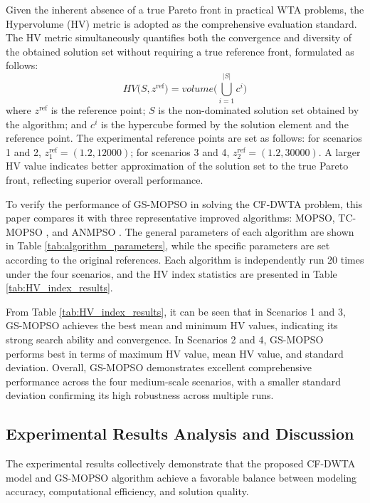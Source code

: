 \documentclass[lettersize,journal]{IEEEtran}
\begin{document}
Given the inherent absence of a true Pareto front in practical WTA problems, the Hypervolume (HV) metric \cite{guerreiro2021hypervolume} is adopted as the comprehensive evaluation standard. The HV metric simultaneously quantifies both the convergence and diversity of the obtained solution set without requiring a true reference front, formulated as follows:
\begin{equation}
HV\big(S,z^{\text{ref}}\big)=volume\bigg(\bigcup_{i=1}^{|S|}c^i\bigg)
\end{equation}
where $z^{\text{ref}}$ is the reference point; $S$ is the non-dominated solution set obtained by the algorithm; and $c^i$ is the hypercube formed by the solution element and the reference point. The experimental reference points are set as follows: for scenarios 1 and 2, $z^{\text{ref}}_1= (1.2, 12000)$; for scenarios 3 and 4, $z^{\text{ref}}_2= (1.2, 30000)$. A larger HV value indicates better approximation of the solution set to the true Pareto front, reflecting superior overall performance.

To verify the performance of GS-MOPSO in solving the CF-DWTA problem, this paper compares it with three representative improved algorithms: MOPSO, TC-MOPSO \cite{han2022improved}, and ANMPSO \cite{gu2021multi}. The general parameters of each algorithm are shown in Table \ref{tab:algorithm_parameters}, while the specific parameters are set according to the original references. Each algorithm is independently run 20 times under the four scenarios, and the HV index statistics are presented in Table \ref{tab:HV_index_results}.

From Table \ref{tab:HV_index_results}, it can be seen that in Scenarios 1 and 3, GS-MOPSO achieves the best mean and minimum HV values, indicating its strong search ability and convergence. In Scenarios 2 and 4, GS-MOPSO performs best in terms of maximum HV value, mean HV value, and standard deviation. Overall, GS-MOPSO demonstrates excellent comprehensive performance across the four medium-scale scenarios, with a smaller standard deviation confirming its high robustness across multiple runs.

\subsection{Experimental Results Analysis and Discussion}
The experimental results collectively demonstrate that the proposed CF-DWTA model and GS-MOPSO algorithm achieve a favorable balance between modeling accuracy, computational efficiency, and solution quality.
\end{document}
